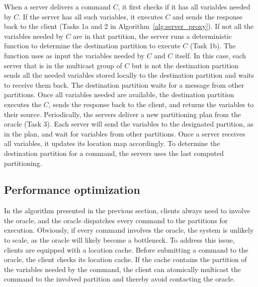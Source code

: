 When a server delivers a command $C$, it first checks if it has all variables
needed by $C$. If the server has all such variables, it executes $C$ and sends
the response back to the client (Tasks 1a and 2 in
Algorithm~\ref{alg:server_proxy}). If not all the variables needed by $C$ are in
that partition, the server runs a deterministic function to determine the
destination partition to execute $C$ (Task 1b). The function uses as input the
variables needed by $C$ and $C$ itself. In this case, each server that is in the
multicast group of $C$ but is not the destination partition sends all the needed
variables stored locally to the destination partition and waits to receive them
back. The destination partition waits for a message from other partitions. Once
all variables needed are available, the destination partition executes the $C$,
sends the response back to the client, and returns the variables to their
source. Periodically, the servers deliver a new partitioning plan from the
oracle (Task 3). Each server will send the variables to the designated
partition, as in the plan, and wait for variables from other partitions. Once a
server receives all variables, it updates its location map accordingly.
To determine the destination partition for a command, the servers uses the last
computed partitioning.


\subsection{Performance optimization}
\label{sec:optm}

%
In the algorithm presented in the previous section, clients always need to
involve the oracle, and the oracle dispatches every command to the partitions
for execution. Obviously, if every command involves the oracle, the system is
unlikely to scale, as the oracle will likely become a bottleneck. To address
this issue, clients are equipped with a location cache. Before submitting a
command to the oracle, the client checks its location cache. If the cache
contains the partition of the variables needed by the command, the client can
atomically multicast the command to the involved partition and thereby avoid
contacting the oracle.

